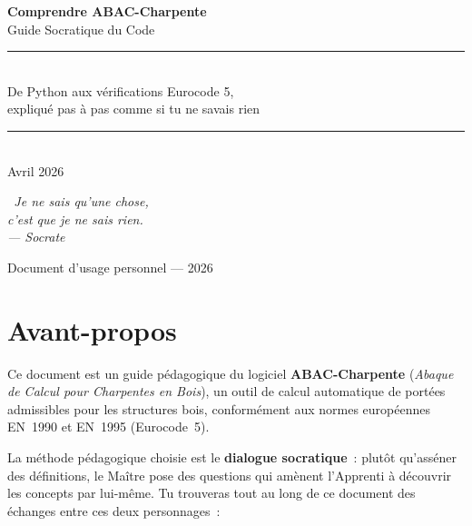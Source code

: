 \documentclass[12pt, a4paper, openany]{book}
\begin{document}

\begin{titlepage}
\centering
\vspace*{1.5cm}
{\fontsize{28}{34}\bfseries Comprendre ABAC-Charpente}\\[0.6cm]
{\LARGE Guide Socratique du Code}\\[1.5cm]
\rule{\textwidth}{1.5pt}\\[0.5cm]
{\large De Python aux v\'erifications Eurocode 5,\\
expliqu\'e pas \`a pas comme si tu ne savais rien}\\[0.5cm]
\rule{\textwidth}{1.5pt}\\[2cm]
{\large Avril 2026}\\[3cm]

\begin{tcolorbox}[
  colback=bleuMaitreLight, colframe=bleuMaitre,
  width=0.85\textwidth, center
]
\centering\large\itshape
\guillemotleft\, Je ne sais qu'une chose,\\
c'est que je ne sais rien.\,\guillemotright\\[4pt]
{\normalsize --- Socrate}
\end{tcolorbox}

\vfill
{\small Document d'usage personnel --- 2026}
\end{titlepage}

\tableofcontents
\newpage

\chapter*{Avant-propos}

Ce document est un guide p\'edagogique du logiciel \textbf{ABAC-Charpente}
(\emph{Abaque de Calcul pour Charpentes en Bois}), un outil de calcul
automatique de port\'ees admissibles pour les structures bois,
conform\'ement aux normes europ\'eennes EN~1990 et EN~1995 (Eurocode~5).

La m\'ethode p\'edagogique choisie est le \textbf{dialogue socratique}~: plut\^ot
qu'asséner des d\'efinitions, le Ma\^itre pose des questions qui am\`enent
l'Apprenti \`a d\'ecouvrir les concepts par lui-m\^eme. Tu trouveras tout au
long de ce document des \'echanges entre ces deux personnages~:
\end{document}
